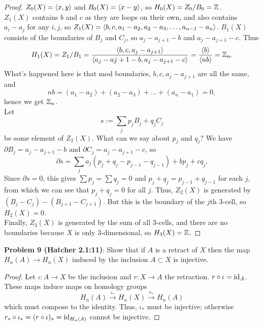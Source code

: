 \documentclass{amsart}
\begin{document}
\begin{proof}
	$Z_0(X)=\langle x,y\rangle$ and $B_0(X)=\langle x-y\rangle$, so $H_0(X)=Z_0/B_0=\mathbb{Z}$.\\
	
	$Z_1(X)$ contains $b$ and $c$ as they are loops on their own, and also contains $a_i-a_j$ for any $i,j$, so $Z_1(X) = \langle b,c,a_1-a_2,a_2-a_3,\dots,a_{n-1}-a_n\rangle$. $B_1(X)$ consists of the boundaries of $B_j$ and $C_j$, so $a_j-a_{j+1}-b$ and $a_j-a_{j+1}-c$. Thus
	$$
	H_1(X) = Z_1/B_1 = \frac{\langle b,c,a_j-a_{j+1}\rangle}{\langle a_j-a{j+1}-b,a_{j}-a_{j+1}-c\rangle} = \frac{\langle b\rangle}{\langle nb\rangle} = \mathbb{Z}_n.
	$$
	What's happened here is that mod boundaries, $b,c,a_j-a_{j+1}$ are all the same, and $$nb=(a_1-a_2)+(a_2-a_3)+\dots+(a_n-a_1)=0,$$ 
	hence we get $\mathbb{Z}_n$.\\
	
	Let 
	$$
	s := \sum_j p_{j} B_j + q_j C_j
	$$ 
	be some element of $Z_2(X)$. What can we say about $p_j$ and $q_j$? We have $\partial B_j = a_j-a_{j+1}-b$ and $\partial C_j = a_j-a_{j+1}-c$, so
	$$
	\partial s = \sum_j a_j(p_j + q_j - p_{j-1} - q_{j-1}) + bp_j + cq_j. 
	$$ 
	Since $\partial s=0$, this gives $\sum p_j = \sum q_j=0$ and $p_j+q_j=p_{j-1}+q_{j-1}$ for each $j$, from which we can see that $p_j+q_j=0$ for all $j$. Thus, $Z_2(X)$ is generated by $(B_j-C_j) - (B_{j+1}-C_{j+1})$. But this is the boundary of the $j$th 3-cell, so $H_2(X)=0$.\\
	
	Finally, $Z_3(X)$ is generated by the sum of all 3-cells, and there are no boundaries because $X$ is only 3-dimensional, so $H_3(X)=\mathbb{Z}$.
\end{proof}

\newpage 
\textbf{Problem 9 (Hatcher 2.1:11)}: Show that if $A$ is a retract of $X$ then the map $H_n(A)\to H_n(X)$ induced by the inclusion $A\subset X$ is injective.

\begin{proof}
	Let $\iota:A\to X$ be the inclusion and $r:X\to A$ the retraction. $r\circ \iota=\operatorname{id}_A$. These maps induce maps on homology groups
	$$
	H_n(A)\xrightarrow{\iota_*} H_n(X) \xrightarrow{r_*} H_n(A)
	$$ 
	which must compose to the identity. Thus, $\iota_*$ must be injective; otherwise $r_*\circ \iota_* = (r\circ \iota)_* = \operatorname{id}_{H_n(A)}$ cannot be injective.
\end{proof}
\end{document}
